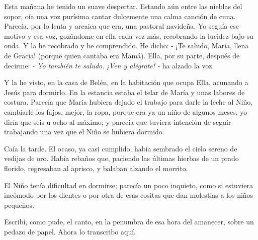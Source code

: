 \documentclass[12pt, twoside, openright]{book} %
\begin{document}
Esta mañana he tenido un suave despertar. Estando aún entre las nieblas del sopor, oía una voz purísima cantar dulcemente una calma canción de cuna. Parecía, por lo lenta y arcaica que era, una pastoral navideña. Yo seguía ese motivo y esa voz, gozándome en ella cada vez más, recobrando la lucidez bajo su onda. Y la he recobrado y he comprendido. He dicho: - ¡Te saludo, María, llena de Gracia! (porque quien cantaba era Mamá). Ella, por su parte, después de decirme: 
\emph{- Yo también te saludo. ¡Ven y alégrate! -} ha alzado la voz.

Y la he visto, en la casa de Belén, en la habitación que ocupa Ella, acunando a Jesús para dormirlo. En la estancia estaba el telar de María y unas labores de costura. Parecía que María hubiera dejado el trabajo para darle la leche al Niño, cambiarle los fajos, mejor, la ropa, porque era ya un niño de algunos meses, yo diría que seis u ocho al máximo; y parecía que tuviera intención de seguir trabajando una vez que el Niño se hubiera dormido. 

Caía la tarde. El ocaso, ya casi cumplido, había sembrado el cielo sereno de vedijas de oro. Había rebaños que, paciendo las últimas hierbas de un prado florido, regresaban al aprisco, y balaban alzando el morrito. 

El Niño tenía dificultad en dormirse; parecía un poco inquieto, como si estuviera incómodo por los dientes o por otra de esas cositas que dan molestias a los niños pequeños. 

Escribí, como pude, el canto, en la penumbra de esa hora del amanecer, sobre un pedazo de papel. Ahora lo transcribo aquí. 
\end{document}

